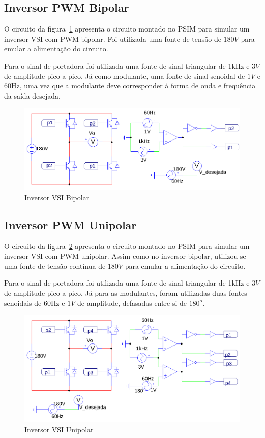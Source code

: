 \documentclass[
	12pt,				%
	openright,			%
	onseside,
	a4paper,			%
	english,			%
	french,				%
	spanish,			%
	brazil,				%
	]{abntex2}
\begin{document}
\subsection{Inversor PWM Bipolar}

O circuito da figura~\ref{fig:VSI_bip_circ} apresenta o circuito montado no PSIM para simular um inversor VSI com PWM bipolar. Foi utilizada uma fonte de tensão de $180V$ para emular a alimentação do circuito.

Para o sinal de portadora foi utilizada uma fonte de sinal triangular de 1kHz e $3V$ de amplitude pico a pico. Já como modulante, uma fonte de sinal senoidal de $1V$ e 60Hz, uma vez que a modulante deve corresponder à forma de onda e frequência da saída desejada.

\begin{figure}[htbp]%
	\centering%
		\includegraphics[width=0.75 \linewidth]{vsi_bipolar_psim_circ}
		\caption{Inversor VSI Bipolar}
		\label{fig:VSI_bip_circ}
\end{figure}

\subsection{Inversor PWM Unipolar}

O circuito da figura~\ref{fig:VSI_uni_circ} apresenta o circuito montado no PSIM para simular um inversor VSI com PWM unipolar. Assim como no inversor bipolar, utilizou-se uma fonte de tensão contínua de $180V$ para emular a alimentação do circuito.

Para o sinal de portadora foi utilizada uma fonte de sinal triangular de 1kHz e $3V$ de amplitude pico a pico. Já para as modulantes, foram utilizadas duas fontes senoidais de 60Hz e $1V$ de amplitude, defasadas entre si de $180^o$.
\begin{figure}[htbp]%
	\centering%
		\includegraphics[width=0.75 \linewidth]{vsi_unipolar_psim_circ}
		\caption{Inversor VSI Unipolar}
		\label{fig:VSI_uni_circ}
\end{figure}
\end{document}
